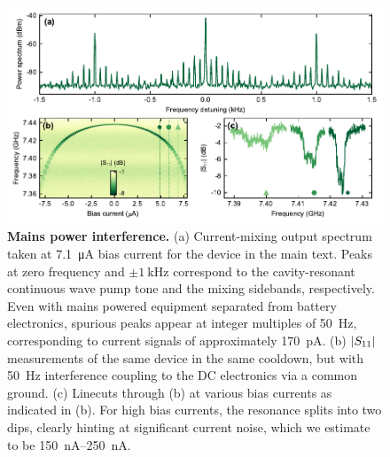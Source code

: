\begin{figure}
	\centering
	\includegraphics[width=\linewidth]{chapter-currentdetection/figures/SM_50Hz_interference}
	\caption{
		\textbf{Mains power interference.}
		(a) Current-mixing output spectrum taken at \SI{7.1}{\micro\ampere} bias current for the device in the main text.
		Peaks at zero frequency and $\pm\SI{1}{\kilo\hertz}$ correspond to the cavity-resonant continuous wave pump tone and the mixing sidebands, respectively.
		Even with mains powered equipment separated from battery electronics, spurious peaks appear at integer multiples of \SI{50}{\hertz}, corresponding to current signals of approximately \SI{170}{\pico\ampere}.
		(b) $\lvert S_{11}\rvert$ measurements of the same device in the same cooldown, but with \SI{50}{\hertz} interference coupling to the DC electronics via a common ground.
		(c) Linecuts through (b) at various bias currents as indicated in (b).
		For high bias currents, the resonance splits into two dips, clearly hinting at significant current noise, which we estimate to be \SIrange{150}{250}{\nano\ampere}.
	}
	\label{fig:50hzinterference}
\end{figure}

